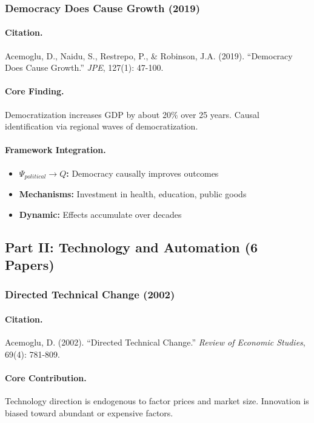 \documentclass[12pt,a4paper]{article}
\begin{document}
\subsubsection{Democracy Does Cause Growth (2019)}

\paragraph{Citation.}
Acemoglu, D., Naidu, S., Restrepo, P., \& Robinson, J.A. (2019).
``Democracy Does Cause Growth.'' \emph{JPE}, 127(1): 47-100.

\paragraph{Core Finding.}
Democratization increases GDP by about 20\% over 25 years.
Causal identification via regional waves of democratization.

\paragraph{Framework Integration.}
\begin{itemize}
  \item \textbf{$\Psi_{political} \to Q$:} Democracy causally improves outcomes
  \item \textbf{Mechanisms:} Investment in health, education, public goods
  \item \textbf{Dynamic:} Effects accumulate over decades
\end{itemize}

\subsection{Part II: Technology and Automation (6 Papers)}

\subsubsection{Directed Technical Change (2002)}

\paragraph{Citation.}
Acemoglu, D. (2002). ``Directed Technical Change.''
\emph{Review of Economic Studies}, 69(4): 781-809.

\paragraph{Core Contribution.}
Technology direction is endogenous to factor prices and market size.
Innovation is biased toward abundant or expensive factors.
\end{document}
